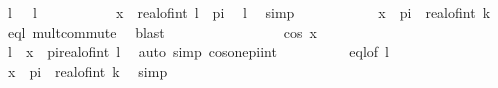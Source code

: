 \begin{isabellebody}
\ {\isacharquery}{\kern0pt}l\ {\isacharequal}{\kern0pt}\ {\isachardoublequoteopen}{}{\isacharasterisk}{\kern0pt}\ l\ {\isacharplus}{\kern0pt}{}{\isachardoublequoteclose}\isanewline
\ \ \ \ \ \ \ \ \isamarkupfalse%
\ {\isachardoublequoteopen}x\ {\isacharequal}{\kern0pt}\ real{\isacharunderscore}{\kern0pt}of{\isacharunderscore}{\kern0pt}int\ {\isacharquery}{\kern0pt}l\ {\isacharasterisk}{\kern0pt}\ pi{\isachardoublequoteclose}\ \isamarkupfalse%
\ l\ \isamarkupfalse%
\ simp\isanewline
\ \ \ \ \ \ \ \ \isamarkupfalse%
\ \isamarkupfalse%
\ {\isachardoublequoteopen}x\ {\isacharequal}{\kern0pt}\ pi\ {\isacharasterisk}{\kern0pt}\ real{\isacharunderscore}{\kern0pt}of{\isacharunderscore}{\kern0pt}int\ k{\isachardoublequoteclose}\ \isamarkupfalse%
\ eql\ mult{\isachardot}{\kern0pt}commute\ \isamarkupfalse%
\ blast\isanewline
\ \ \ \ \ \ \isamarkupfalse%
\isanewline
\ \ \ \ \ \ \ \ \isamarkupfalse%
\ {\isachardoublequoteopen}cos\ x\ {\isacharequal}{\kern0pt}\ {}{\isachardoublequoteclose}\isanewline
\ \ \ \ \ \ \ \ \isamarkupfalse%
\ \isamarkupfalse%
\ l\ \ {\isachardoublequoteopen}x\ {\isacharequal}{\kern0pt}\ pi{\isacharasterisk}{\kern0pt}{\isacharparenleft}{\kern0pt}{}{\isacharasterisk}{\kern0pt}real{\isacharunderscore}{\kern0pt}of{\isacharunderscore}{\kern0pt}int\ l{\isacharparenright}{\kern0pt}{\isachardoublequoteclose}\ \isamarkupfalse%
\ {\isacharparenleft}{\kern0pt}auto\ simp{\isacharcolon}{\kern0pt}\ cos{\isacharunderscore}{\kern0pt}one{\isacharunderscore}{\kern0pt}{}pi{\isacharunderscore}{\kern0pt}int{\isacharparenright}{\kern0pt}\isanewline
\ \ \ \ \ \ \ \ \isamarkupfalse%
\ eql{\isacharbrackleft}{\kern0pt}of\ {\isachardoublequoteopen}{\isacharparenleft}{\kern0pt}{}{\isacharasterisk}{\kern0pt}l{\isacharparenright}{\kern0pt}{\isachardoublequoteclose}{\isacharbrackright}{\kern0pt}\ \isamarkupfalse%
\ {\isachardoublequoteopen}x\ {\isacharequal}{\kern0pt}\ pi\ {\isacharasterisk}{\kern0pt}\ real{\isacharunderscore}{\kern0pt}of{\isacharunderscore}{\kern0pt}int\ k{\isachardoublequoteclose}\ \isamarkupfalse%
\ simp\isanewline
\ \ \ \ \ \ \isamarkupfalse%
\isanewline
\ \ \ \ \isamarkupfalse%
\isanewline
\ \ \isamarkupfalse%

\end{isabellebody}
